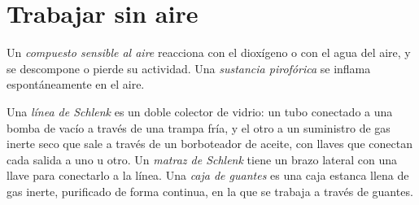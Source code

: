 \section{Trabajar sin aire}

\begin{definition}\label{def:b3:lab-techniques-3:air-sensitive}
Un \emph{compuesto sensible al aire} reacciona con el
dioxígeno o con el agua del aire, y se descompone o pierde su actividad. Una
\emph{sustancia pirofórica} se inflama espontáneamente en
el aire.
\end{definition}

\begin{definition}\label{def:b3:lab-techniques-3:schlenk}
Una \emph{línea de Schlenk} es un doble colector de vidrio: un tubo
conectado a una bomba de vacío a través de una trampa fría, y el otro a un suministro de gas inerte
seco que sale a través de un borboteador de aceite, con llaves que conectan cada salida a
uno u otro. Un \emph{matraz de Schlenk} tiene un brazo lateral con una llave
para conectarlo a la línea. Una \emph{caja de guantes} es una caja estanca
llena de gas inerte, purificado de forma continua, en la que se trabaja a través de
guantes.
\end{definition}

